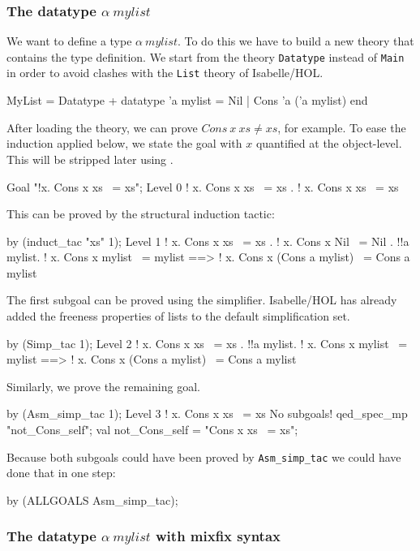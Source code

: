 \subsubsection{The datatype $\alpha~mylist$}

We want to define a type $\alpha~mylist$. To do this we have to build a new
theory that contains the type definition.  We start from the theory
\texttt{Datatype} instead of \texttt{Main} in order to avoid clashes with the
\texttt{List} theory of Isabelle/HOL.
\begin{ttbox}
MyList = Datatype +
  datatype 'a mylist = Nil | Cons 'a ('a mylist)
end
\end{ttbox}
After loading the theory, we can prove $Cons~x~xs\neq xs$, for example.  To
ease the induction applied below, we state the goal with $x$ quantified at the
object-level.  This will be stripped later using .
\begin{ttbox}
Goal "!x. Cons x xs ~= xs";
{\out Level 0}
{\out ! x. Cons x xs ~= xs}
{. ! x. Cons x xs ~= xs}
\end{ttbox}
This can be proved by the structural induction tactic:
\begin{ttbox}
by (induct_tac "xs" 1);
{\out Level 1}
{\out ! x. Cons x xs ~= xs}
{. ! x. Cons x Nil ~= Nil}
{. !!a mylist.}
{\out        ! x. Cons x mylist ~= mylist ==>}
{\out        ! x. Cons x (Cons a mylist) ~= Cons a mylist}
\end{ttbox}
The first subgoal can be proved using the simplifier.  Isabelle/HOL has
already added the freeness properties of lists to the default simplification
set.
\begin{ttbox}
by (Simp_tac 1);
{\out Level 2}
{\out ! x. Cons x xs ~= xs}
{. !!a mylist.}
{\out        ! x. Cons x mylist ~= mylist ==>}
{\out        ! x. Cons x (Cons a mylist) ~= Cons a mylist}
\end{ttbox}
Similarly, we prove the remaining goal.
\begin{ttbox}
by (Asm_simp_tac 1);
{\out Level 3}
{\out ! x. Cons x xs ~= xs}
{\out No subgoals!}
\ttbreak
qed_spec_mp "not_Cons_self";
{\out val not_Cons_self = "Cons x xs ~= xs";}
\end{ttbox}
Because both subgoals could have been proved by \texttt{Asm_simp_tac}
we could have done that in one step:
\begin{ttbox}
by (ALLGOALS Asm_simp_tac);
\end{ttbox}


\subsubsection{The datatype $\alpha~mylist$ with mixfix syntax}

